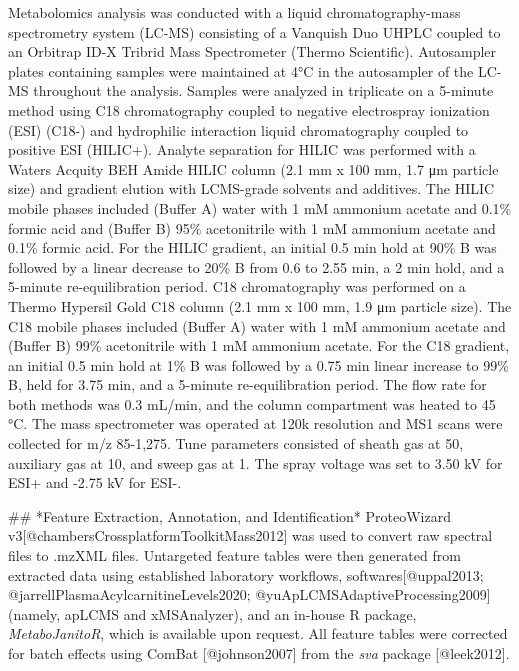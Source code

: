 \noindent\hspace{1.5em}Metabolomics analysis was conducted with a liquid chromatography-mass spectrometry system (LC-MS) consisting of a Vanquish Duo UHPLC coupled to an Orbitrap ID-X Tribrid Mass Spectrometer (Thermo Scientific). Autosampler plates containing samples were maintained at 4°C in the autosampler of the LC-MS throughout the analysis. Samples were analyzed in triplicate on a 5-minute method using C18 chromatography coupled to negative electrospray ionization (ESI) (C18-) and hydrophilic interaction liquid chromatography coupled to positive ESI (HILIC+). Analyte separation for HILIC was performed with a Waters Acquity BEH Amide HILIC column (2.1 mm x 100 mm, 1.7 μm particle size) and gradient elution with LCMS-grade solvents and additives. The HILIC mobile phases included (Buffer A) water with 1 mM ammonium acetate and 0.1\% formic acid and (Buffer B) 95\% acetonitrile with 1 mM ammonium acetate and 0.1\% formic acid. For the HILIC gradient, an initial 0.5 min hold at 90\% B was followed by a linear decrease to 20\% B from 0.6 to 2.55 min, a 2 min hold, and a 5-minute re-equilibration period. C18 chromatography was performed on a Thermo Hypersil Gold C18 column (2.1 mm x 100 mm, 1.9 μm particle size). The C18 mobile phases included (Buffer A) water with 1 mM ammonium acetate and (Buffer B) 99\% acetonitrile with 1 mM ammonium acetate. For the C18 gradient, an initial 0.5 min hold at 1\% B was followed by a 0.75 min linear increase to 99\% B, held for 3.75 min, and a 5-minute re-equilibration period. The flow rate for both methods was 0.3 mL/min, and the column compartment was heated to 45 °C. The mass spectrometer was operated at 120k resolution and MS1 scans were collected for m/z 85-1,275. Tune parameters consisted of sheath gas at 50, auxiliary gas at 10, and sweep gas at 1. The spray voltage was set to 3.50 kV for ESI+ and -2.75 kV for ESI-.

## *Feature Extraction, Annotation, and Identification*
ProteoWizard v3[@chambersCrossplatformToolkitMass2012] was used to convert raw spectral files to .mzXML files. Untargeted feature tables were then generated from extracted data using established laboratory workflows, softwares[@uppal2013; @jarrellPlasmaAcylcarnitineLevels2020; @yuApLCMSAdaptiveProcessing2009] (namely, apLCMS and xMSAnalyzer), and an in-house R package, \textit{MetaboJanitoR}, which is available upon request. All feature tables were corrected for batch effects using ComBat [@johnson2007] from the \textit{sva} package [@leek2012].

